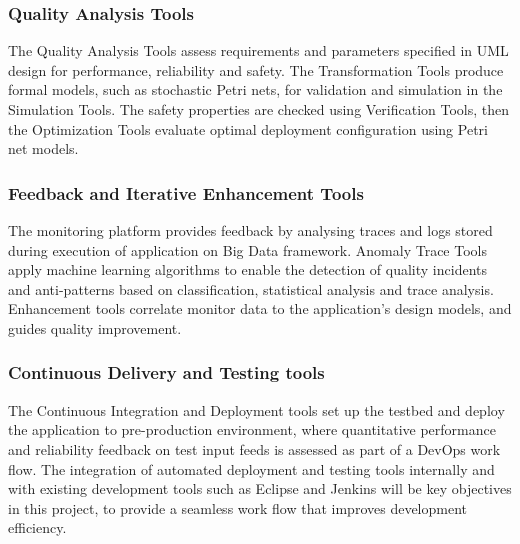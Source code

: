 \subsubsection{Quality Analysis Tools}
The Quality Analysis Tools assess requirements and parameters specified in UML design for performance, reliability and safety. The Transformation Tools produce formal models, such as stochastic Petri nets, for validation and simulation in the Simulation Tools. The safety properties are checked using Verification Tools, then the Optimization Tools evaluate optimal deployment configuration using Petri net models. 
\subsubsection{Feedback and Iterative Enhancement Tools}
The monitoring platform provides feedback by analysing traces and logs stored during execution of application on Big Data framework. Anomaly Trace Tools apply machine learning algorithms to enable the detection of quality incidents and anti-patterns based on classification, statistical analysis and trace analysis. Enhancement tools correlate monitor data to the application's design models, and guides quality improvement.
\subsubsection{Continuous Delivery and Testing tools}
The Continuous Integration and Deployment tools set up the testbed and deploy the application to pre-production environment, where quantitative performance and reliability feedback on test input feeds is assessed as part of a DevOps work flow. The integration of automated deployment and testing tools internally and with existing development tools such as Eclipse and Jenkins will be key objectives in this project, to provide a seamless work flow that improves development efficiency.

\newpage
